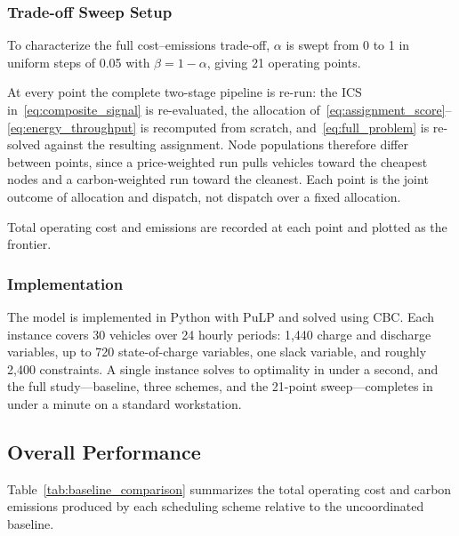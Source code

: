 \documentclass[sustainability,article,submit,moreauthors,pdftex]{Definitions/mdpi}
\begin{document}
\subsubsection{Trade-off Sweep Setup}
\label{sec:sweep_setup}

To characterize the full cost--emissions trade-off, $\alpha$ is swept from 0 to 1 in uniform steps of 0.05 with $\beta = 1 - \alpha$, giving 21 operating points.

At every point the complete two-stage pipeline is re-run: the ICS in~\eqref{eq:composite_signal} is re-evaluated, the allocation of~\eqref{eq:assignment_score}--\eqref{eq:energy_throughput} is recomputed from scratch, and~\eqref{eq:full_problem} is re-solved against the resulting assignment. Node populations therefore differ between points, since a price-weighted run pulls vehicles toward the cheapest nodes and a carbon-weighted run toward the cleanest. Each point is the joint outcome of allocation and dispatch, not dispatch over a fixed allocation.

Total operating cost and emissions are recorded at each point and plotted as the frontier.

\subsubsection{Implementation}

The model is implemented in Python with PuLP and solved using CBC. Each instance covers 30 vehicles over 24 hourly periods: 1{,}440 charge and discharge variables, up to 720 state-of-charge variables, one slack variable, and roughly 2{,}400 constraints. A single instance solves to optimality in under a second, and the full study---baseline, three schemes, and the 21-point sweep---completes in under a minute on a standard workstation.


\subsection{Overall Performance}
\label{sec:overall}

Table~\ref{tab:baseline_comparison} summarizes the total operating cost and carbon emissions produced by each scheduling scheme relative to the uncoordinated baseline.
\end{document}
